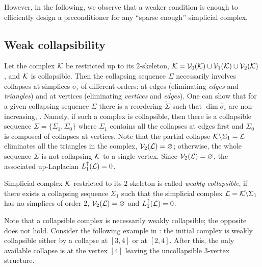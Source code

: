 However, in the following, we observe that a weaker condition is enough to efficiently design a preconditioner for any ``sparse enough'' simplicial complex.

\subsection{Weak collapsibility}


Let the complex \( \mathcal{K} \) be restricted up to its \(2\)-skeleton, \( \mathcal{K} = \mathcal{V}_{0}(\mathcal{K}) \cup \mathcal{V}_{1}(\mathcal{K}) \cup \mathcal{V}_{2}(\mathcal{K}) \), and \( \mathcal{K} \) is collapsible. Then the collapsing sequence \( \Sigma \) necessarily involves collapses at simplices \( \sigma_i \) of different orders: at edges (eliminating \emph{edges} and \emph{triangles}) and at vertices (eliminating \emph{vertices} and \emph{edges}). One can show that for a given collapsing sequence \( \Sigma \) there is a reordering \( \tilde \Sigma \) such that \( \dim \tilde{\sigma_i} \) are non-increasing, {\cite[Lemma 2.5]{cohenSolving1laplaciansNearly2014}}. Namely, if such a complex is collapsible, then there is a collapsible sequence \( \Sigma = \{ \Sigma_1, \Sigma_0 \} \) where \( \Sigma_1 \) contains all the collapses at edges first and \( \Sigma_0 \) is composed of collapses at vertices. Note that the partial collapse \( \mathcal{K} \backslash \Sigma_1 = \mathcal{L} \) eliminates all the triangles in the complex, \( \mathcal{V}_2 (\mathcal{L}) = \varnothing \); otherwise, the whole sequence \( \Sigma \) is not collapsing \( \mathcal{K} \) to a single vertex. Since \( \mathcal{V}_2 (\mathcal{L} ) = \varnothing \), the associated up-Laplacian \( L_{1}^{\uparrow} ( \mathcal{L} ) = 0 \).

\begin{definition}
      Simplicial complex \( \mathcal{K} \) restricted to its \(2\)-skeleton is called \emph{weakly collapsible}, if there exists a collapsing sequence \( \Sigma_1 \) such that the simplicial complex \( \mathcal{L} = \mathcal{K} \backslash \Sigma_1 \) has no simplices of order \(2\), \( \mathcal{V}_2(\mathcal{L}) = \varnothing \) and \( L_{1}^{\uparrow} (\mathcal{L} ) = 0 \).
\end{definition}

\begin{example}
      Note that a collapsible complex is necessarily weakly collapsible; the opposite does not hold. Consider the following example in : the initial complex is weakly collapsible either by a collapse at \( [3, 4] \) or at \( [2, 4] \). After this, the only available collapse is at the vertex \([4]\) leaving the uncollapsible \(3\)-vertex structure.
\end{example}

